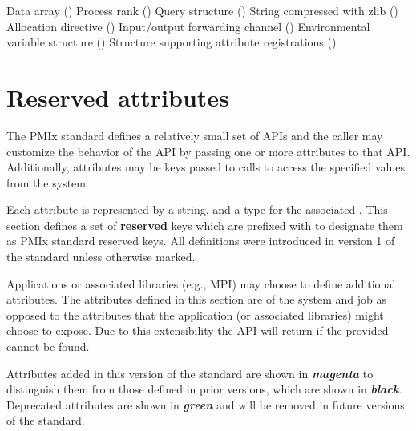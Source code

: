 \begin{constantdesc}
%
Data array ()
%
Process rank ()
%
Query structure ()
%
String compressed with zlib ()
%
Allocation directive ()
%
Input/output forwarding channel ()
%
Environmental variable structure ()
%
Structure supporting attribute registrations ()
%
\end{constantdesc}

\section{Reserved attributes}
\label{api:struct:attributes}

The PMIx standard defines a relatively small set of APIs and the caller may customize the behavior of the API by passing one or more attributes to that API.
Additionally, attributes may be keys passed to  calls to access the specified values from the system.

Each attribute is represented by a  string, and a type for the associated .
This section defines a set of \textbf{reserved} keys which are prefixed with  to designate them as PMIx standard reserved keys. All definitions were introduced in version 1 of the standard unless otherwise marked.

Applications or associated libraries (e.g., \ac{MPI}) may choose to define additional attributes.
The attributes defined in this section are of the system and job as opposed to the attributes that the application (or associated libraries) might choose to expose.
Due to this extensibility the  API will return  if the provided  cannot be found.

Attributes added in this version of the standard are shown in \textit{\textbf{\color{magenta}magenta}} to distinguish them from those defined in prior versions, which are shown in \textit{\textbf{black}}. Deprecated attributes are shown in \textit{\textbf{\color{green!80!black}green}} and will be removed in future versions of the standard.

